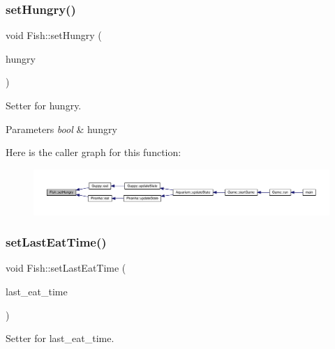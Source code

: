 \subsubsection{\texorpdfstring{set\+Hungry()}{setHungry()}}
{\footnotesize\ttfamily void Fish\+::set\+Hungry (\begin{DoxyParamCaption}\item[{bool}]{hungry }\end{DoxyParamCaption})}



Setter for hungry. 


\begin{DoxyParams}{Parameters}
{\em bool} & hungry \\
\hline
\end{DoxyParams}
Here is the caller graph for this function\+:\nopagebreak
\begin{figure}[H]
\begin{center}
\leavevmode
\includegraphics[width=350pt]{class_fish_a8b24063bf538f0502cf38ce5859aec8e_icgraph}
\end{center}
\end{figure}
\mbox{\label{class_fish_ad53bd870836825ab0cc4b4d987325772}} 
\subsubsection{\texorpdfstring{set\+Last\+Eat\+Time()}{setLastEatTime()}}
{\footnotesize\ttfamily void Fish\+::set\+Last\+Eat\+Time (\begin{DoxyParamCaption}\item[{double}]{last\+\_\+eat\+\_\+time }\end{DoxyParamCaption})}



Setter for last\+\_\+eat\+\_\+time. 


